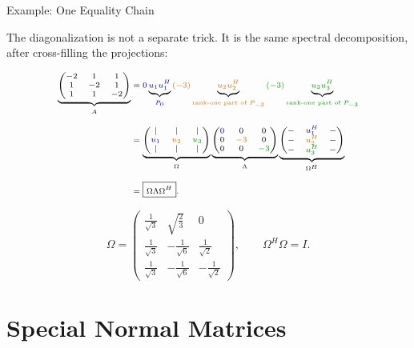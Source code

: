 \documentclass[10pt]{beamer}
\theoremstyle{definition}
\newcommand{\bl}[1]{{\color{blue!70!black}#1}}
\newcommand{\gn}[1]{{\color{green!60!black}#1}}
\newcommand{\ora}[1]{{\color{orange!85!black}#1}}
\begin{document}
\begin{frame}[shrink=15]{Example: One Equality Chain}

The diagonalization is not a separate trick.
It is the same spectral decomposition, after cross-filling the projections:

\[
\scriptsize
\begin{aligned}
\underbrace{
\begin{pmatrix}
-2&1&1\\
1&-2&1\\
1&1&-2
\end{pmatrix}}_{A}
&=
\bl{0}\underbrace{\bl{u_1}\bl{u_1^H}}_{\bl{P_0}}
\ora{(-3)}\underbrace{\ora{u_2}\ora{u_2^H}}_{\ora{\text{rank-one part of }P_{-3}}}
\gn{(-3)}\underbrace{\gn{u_3}\gn{u_3^H}}_{\gn{\text{rank-one part of }P_{-3}}}
\\[0.7em]
&=
\underbrace{
\begin{pmatrix}
|&|&|\\
\bl{u_1}&\ora{u_2}&\gn{u_3}\\
|&|&|
\end{pmatrix}}_{\Omega}
\underbrace{
\begin{pmatrix}
\bl{0}&0&0\\
0&\ora{-3}&0\\
0&0&\gn{-3}
\end{pmatrix}}_{\Lambda}
\underbrace{
\begin{pmatrix}
-&\bl{u_1^H}&-\\
-&\ora{u_2^H}&-\\
-&\gn{u_3^H}&-
\end{pmatrix}}_{\Omega^H}
\\[0.7em]
&=
\boxed{\Omega\Lambda\Omega^H}.
\end{aligned}
\]

\[
\Omega=
\begin{pmatrix}
\frac1{\sqrt3}&\sqrt{\frac23}&0\\[0.25em]
\frac1{\sqrt3}&-\frac1{\sqrt6}&\frac1{\sqrt2}\\[0.25em]
\frac1{\sqrt3}&-\frac1{\sqrt6}&-\frac1{\sqrt2}
\end{pmatrix},
\qquad
\Omega^H\Omega=I.
\]

\end{frame}


\section*{Special Normal Matrices}
\end{document}
